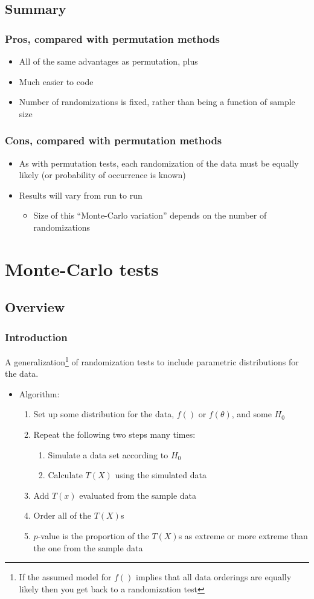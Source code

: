 \documentclass[ignorenonframetext]{beamer} %
\newcommand{\bi}{\begin{itemize}}
\newcommand{\ei}{\end{itemize}}
\begin{document}
\subsection{Summary}

\begin{frame}
	\frametitle{Pros, compared with permutation methods}
	\bi
		\item All of the same advantages as permutation, plus
		\item Much easier to code
		\item Number of randomizations is fixed, rather than being a function of sample size
	\ei
\end{frame}

\begin{frame}
	\frametitle{Cons, compared with permutation methods}
	\bi
		\item As with permutation tests, each randomization of the data must be equally likely (or probability of occurrence is known)
		\item Results will vary from run to run
		\bi
			\item Size of this ``Monte-Carlo variation'' depends on the number of randomizations
		\ei
	\ei
\end{frame}

\section{Monte-Carlo tests}

\subsection{Overview}

\begin{frame}
	\frametitle{Introduction}
A generalization\footnote{If the assumed model for $f()$ implies that all data orderings are equally likely then you get back to a randomization test} of randomization tests to include parametric distributions for the data.
	\bi
		\item Algorithm:
		\begin{enumerate}
			\item Set up some distribution for the data, $f()$ or $f(\theta)$, and some $H_0$
			\item Repeat the following two steps many times:
			\begin{enumerate}
			  \item Simulate a data set according to $H_0$
			  \item Calculate $T(X)$ using the simulated data
			\end{enumerate}
			\item Add $T(x)$ evaluated from the sample data
			\item Order all of the $T(X)$s
			\item $p$-value is the proportion of the $T(X)$s as extreme or more extreme than the one from the sample data
		\end{enumerate}
	\ei

\end{frame}
\end{document}
